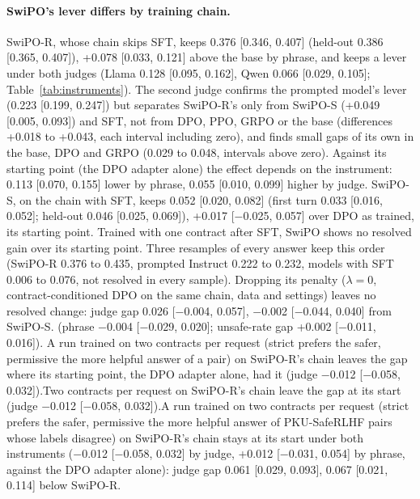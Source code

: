 \paragraph{SwiPO's lever differs by training chain.} \mbox{SwiPO-R}, whose chain skips SFT, keeps 0.376 [0.346, 0.407] (held-out 0.386 [0.365, 0.407]), +0.078 [0.033, 0.121] above the base by phrase, and keeps a lever under both judges (Llama 0.128 [0.095, 0.162], Qwen 0.066 [0.029, 0.105]; Table~\ref{tab:instruments}). \ifvenueMath\else The second judge confirms the prompted model's lever (0.223 [0.199, 0.247]) but separates \mbox{SwiPO-R}'s only from \mbox{SwiPO-S} (+0.049 [0.005, 0.093]) and SFT, not from DPO, PPO, GRPO or the base (differences +0.018 to +0.043, each interval including zero), and finds small gaps of its own in the base, DPO and GRPO (0.029 to 0.048, intervals above zero). \fi{}\ifvenueRobust\else\ifvenueLoyal\else Against its starting point (the DPO adapter alone) the effect depends on the instrument: 0.113 [0.070, 0.155] lower by phrase, 0.055 [0.010, 0.099] higher by judge. \fi\fi{}\mbox{SwiPO-S}, on the chain with SFT, keeps 0.052 [0.020, 0.082]\ifvenueLoyal\else{} (first turn 0.033 [0.016, 0.052]; held-out 0.046 [0.025, 0.069])\fi, +0.017 [$-$0.025, 0.057] over DPO as trained, its starting point. Trained with one contract after SFT, SwiPO shows no resolved gain over its starting point. \ifvenueRobust\def\rsOn{1}\fi\ifvenueBench\def\rsOn{1}\fi\ifdefined\rsOn Three resamples of every answer keep this order (\mbox{SwiPO-R} 0.376 to 0.435, prompted Instruct 0.222 to 0.232, models with SFT 0.006 to 0.076, not resolved in every sample). \fi\ifvenueLoyal\else\ifvenueBench\else Dropping its penalty ($\lambda=0$, contract-conditioned DPO on the same chain, data and settings) leaves no resolved change: judge gap 0.026 [$-$0.004, 0.057], $-$0.002 [$-$0.044, 0.040] from \mbox{SwiPO-S}\ifvenueRobust.\else{} (phrase $-$0.004 [$-$0.029, 0.020]; unsafe-rate gap +0.002 [$-$0.011, 0.016]).\fi\fi\fi{} \ifvenueLoyal\else\ifvenueRobust A run trained on two contracts per request (strict prefers the safer, permissive the more helpful answer of a pair) on \mbox{SwiPO-R}'s chain leaves the gap where its starting point, the DPO adapter alone, had it (judge $-$0.012 [$-$0.058, 0.032]).\else\ifvenueBench Two contracts per request on \mbox{SwiPO-R}'s chain leave the gap at its start (judge $-$0.012 [$-$0.058, 0.032]).\else A run trained on two contracts per request (strict prefers the safer, permissive the more helpful answer of \mbox{PKU-SafeRLHF} pairs whose labels disagree) on \mbox{SwiPO-R}'s chain stays at its start under both instruments ($-$0.012 [$-$0.058, 0.032] by judge, +0.012 [$-$0.031, 0.054] by phrase, against the DPO adapter alone): judge gap 0.061 [0.029, 0.093], 0.067 [0.021, 0.114] below \mbox{SwiPO-R}.\fi\fi\fi{}

